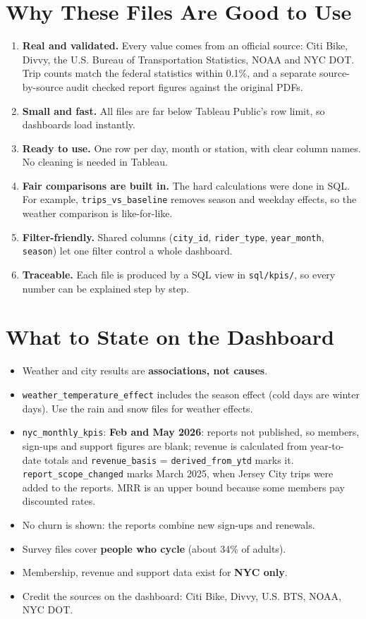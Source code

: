 \documentclass[11pt,a4paper]{article}
\newcommand{\f}[1]{\texttt{\small #1}}
\begin{document}
\section{Why These Files Are Good to Use}
\begin{enumerate}
\item \textbf{Real and validated.} Every value comes from an official source: Citi Bike, Divvy, the U.S. Bureau of Transportation Statistics, NOAA and NYC DOT. Trip counts match the federal statistics within 0.1\%, and a separate source-by-source audit checked report figures against the original PDFs.
\item \textbf{Small and fast.} All files are far below Tableau Public's row limit, so dashboards load instantly.
\item \textbf{Ready to use.} One row per day, month or station, with clear column names. No cleaning is needed in Tableau.
\item \textbf{Fair comparisons are built in.} The hard calculations were done in SQL. For example, \f{trips\_vs\_baseline} removes season and weekday effects, so the weather comparison is like-for-like.
\item \textbf{Filter-friendly.} Shared columns (\f{city\_id}, \f{rider\_type}, \f{year\_month}, \f{season}) let one filter control a whole dashboard.
\item \textbf{Traceable.} Each file is produced by a SQL view in \f{sql/kpis/}, so every number can be explained step by step.
\end{enumerate}

\section{What to State on the Dashboard}
\begin{itemize}
\item Weather and city results are \textbf{associations, not causes}.
\item \f{weather\_temperature\_effect} includes the season effect (cold days are winter days). Use the rain and snow files for weather effects.
\item \f{nyc\_monthly\_kpis}: \textbf{Feb and May 2026}: reports not published, so members, sign-ups and support figures are blank; revenue is calculated from year-to-date totals and \f{revenue\_basis} = \f{derived\_from\_ytd} marks it. \f{report\_scope\_changed} marks March 2025, when Jersey City trips were added to the reports. MRR is an upper bound because some members pay discounted rates.
\item No churn is shown: the reports combine new sign-ups and renewals.
\item Survey files cover \textbf{people who cycle} (about 34\% of adults).
\item Membership, revenue and support data exist for \textbf{NYC only}.
\item Credit the sources on the dashboard: Citi Bike, Divvy, U.S. BTS, NOAA, NYC DOT.
\end{itemize}
\end{document}

